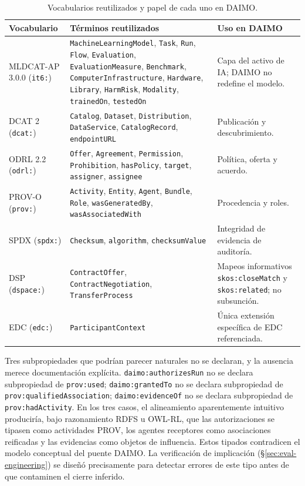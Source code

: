 \documentclass[Afour,sagev,times]{sagej}
\newcommand{\code}[1]{\texttt{#1}}
\begin{document}
\begin{table}[tb]
\small\sf\centering
\caption{Vocabularios reutilizados y papel de cada uno en DAIMO.\label{tab:reuse}}
\begin{tabular}{@{}p{2.6cm}p{5cm}p{7cm}@{}}
\toprule
\textbf{Vocabulario} & \textbf{Términos reutilizados} & \textbf{Uso en DAIMO} \\
\midrule
MLDCAT-AP 3.0.0 (\code{it6:}) & \code{MachineLearningModel}, \code{Task}, \code{Run}, \code{Flow}, \code{Evaluation}, \code{EvaluationMeasure}, \code{Benchmark}, \code{ComputerInfrastructure}, \code{Hardware}, \code{Library}, \code{HarmRisk}, \code{Modality}, \code{trainedOn}, \code{testedOn} & Capa del activo de IA; DAIMO no redefine el modelo. \\
DCAT 2 (\code{dcat:}) & \code{Catalog}, \code{Dataset}, \code{Distribution}, \code{DataService}, \code{CatalogRecord}, \code{endpointURL} & Publicación y descubrimiento. \\
ODRL 2.2 (\code{odrl:}) & \code{Offer}, \code{Agreement}, \code{Permission}, \code{Prohibition}, \code{hasPolicy}, \code{target}, \code{assigner}, \code{assignee} & Política, oferta y acuerdo. \\
PROV-O (\code{prov:}) & \code{Activity}, \code{Entity}, \code{Agent}, \code{Bundle}, \code{Role}, \code{wasGeneratedBy}, \code{wasAssociatedWith} & Procedencia y roles. \\
SPDX (\code{spdx:}) & \code{Checksum}, \code{algorithm}, \code{checksumValue} & Integridad de evidencia de auditoría. \\
DSP (\code{dspace:}) & \code{ContractOffer}, \code{ContractNegotiation}, \code{TransferProcess} & Mapeos informativos \code{skos:closeMatch} y \code{skos:related}; no subsunción. \\
EDC (\code{edc:}) & \code{ParticipantContext} & Única extensión específica de EDC referenciada. \\
\bottomrule
\end{tabular}
\end{table}

Tres subpropiedades que podrían parecer naturales no se declaran, y la ausencia merece documentación explícita. \code{daimo:authorizesRun} no se declara subpropiedad de \code{prov:used}; \code{daimo:grantedTo} no se declara subpropiedad de \code{prov:qualifiedAssociation}; \code{daimo:evidenceOf} no se declara subpropiedad de \code{prov:hadActivity}. En los tres casos, el alineamiento aparentemente intuitivo produciría, bajo razonamiento RDFS u OWL-RL, que las autorizaciones se tipasen como actividades PROV, los agentes receptores como asociaciones reificadas y las evidencias como objetos de influencia. Estos tipados contradicen el modelo conceptual del puente DAIMO. La verificación de implicación (§\ref{sec:eval-engineering}) se diseñó precisamente para detectar errores de este tipo antes de que contaminen el cierre inferido.
\end{document}
